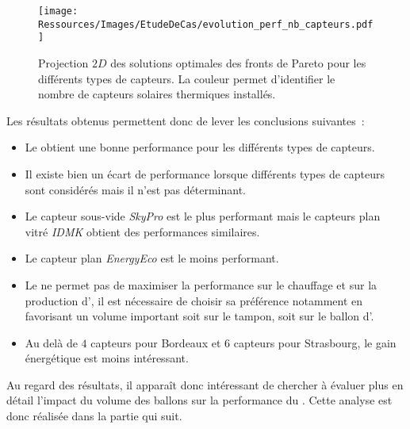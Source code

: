 \begin{figure}
    \centering
    \texttt{[image: Ressources/Images/EtudeDeCas/evolution\_perf\_nb\_capteurs.pdf]}
    \caption[Projection $2D$ des solutions optimales des fronts de Pareto pour les
             différents types de capteurs.]
             {Projection $2D$ des solutions optimales des fronts de Pareto pour les
              différents types de capteurs. La couleur permet d’identifier le nombre
              de capteurs solaires thermiques installés.}
    \label{fig:evolution_front_pareto_nb_th}
\end{figure}


Les résultats obtenus permettent donc de lever les conclusions suivantes~:
\begin{itemize}
    \item Le  obtient une bonne performance pour les différents types de
          capteurs.
    \item Il existe bien un écart de performance lorsque différents types de capteurs
          sont considérés mais il n’est pas déterminant.
    \item Le capteur sous-vide \textit{SkyPro} est le plus performant mais le capteurs
          plan vitré \textit{IDMK} obtient des performances similaires.
    \item Le capteur plan \textit{EnergyEco} est le moins performant.
    \item Le  ne permet pas de maximiser la performance sur le chauffage
          et sur la production d’, il est nécessaire de choisir sa préférence
          notamment en favorisant un volume important soit sur le tampon, soit sur le
          ballon d’.
    \item Au delà de $4$ capteurs pour Bordeaux et $6$ capteurs pour Strasbourg,
          le gain énergétique est moins intéressant.
\end{itemize}

Au regard des résultats, il apparaît donc intéressant de chercher à évaluer plus en détail
l’impact du volume des ballons sur la performance du . Cette analyse est donc
réalisée dans la partie qui suit.


